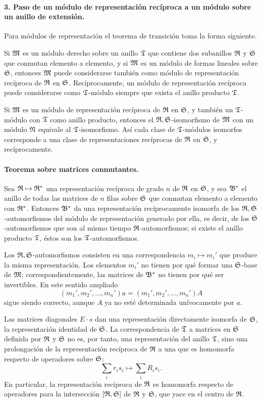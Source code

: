 \paragraph{3. Paso de un módulo de representación recíproca a un módulo sobre un anillo de extensión.}
Para módulos de representación el teorema de transición toma la forma siguiente.

Si \(\mathfrak M\) es un módulo derecho sobre un anillo \(\mathfrak T\) que contiene dos subanillos \(\mathfrak R\) y \(\mathfrak S\) que conmutan elemento a elemento, y si \(\mathfrak M\) es un módulo de formas lineales sobre \(\mathfrak S\), entonces \(\mathfrak M\) puede considerarse también como módulo de representación recíproca de \(\mathfrak R\) en \(\mathfrak S\). Recíprocamente, un módulo de representación recíproca puede considerarse como \(\mathfrak T\)-módulo siempre que exista el anillo producto \(\mathfrak T\).

Si \(\mathfrak M\) es un módulo de representación recíproca de \(\mathfrak R\) en \(\mathfrak S\), y también un \(\mathfrak T\)-módulo con \(\mathfrak T\) como anillo producto, entonces el \(\mathfrak R,\mathfrak S\)-isomorfismo de \(\mathfrak M\) con un módulo \(\mathfrak N\) equivale al \(\mathfrak T\)-isomorfismo. Así cada clase de \(\mathfrak T\)-módulos isomorfos corresponde a una clase de representaciones recíprocas de \(\mathfrak R\) en \(\mathfrak S\), y recíprocamente.

\paragraph{Teorema sobre matrices conmutantes.}
Sea \(\mathfrak R\mapsto\mathfrak R^*\) una representación recíproca de grado \(n\) de \(\mathfrak R\) en \(\mathfrak S\), y sea \(\mathfrak B^*\) el anillo de todas las matrices de \(n\) filas sobre \(\mathfrak S\) que conmutan elemento a elemento con \(\mathfrak R^*\). Entonces \(\mathfrak B^*\) da una representación recíprocamente isomorfa de los \(\mathfrak R,\mathfrak S\)-automorfismos del módulo de representación generado por ella, es decir, de los \(\mathfrak S\)-automorfismos que son al mismo tiempo \(\mathfrak R\)-automorfismos; si existe el anillo producto \(\mathfrak T\), éstos son los \(\mathfrak T\)-automorfismos.

Los \(\mathfrak R,\mathfrak S\)-automorfismos consisten en una correspondencia \(m_i\mapsto m_i'\) que produce la misma representación. Los elementos \(m_i'\) no tienen por qué formar una \(\mathfrak S\)-base de \(\mathfrak M\); correspondientemente, las matrices de \(\mathfrak B^*\) no tienen por qué ser invertibles. En este sentido ampliado
\[
        (m_1',m_2',\ldots,m_n')a=(m_1',m_2',\ldots,m_n')A
\]
sigue siendo correcto, aunque \(A\) ya no esté determinada unívocamente por \(a\).

Las matrices diagonales \(E\cdot s\) dan una representación directamente isomorfa de \(\mathfrak S\), la representación identidad de \(\mathfrak S\). La correspondencia de \(\mathfrak T\) a matrices en \(\mathfrak S\) definida por \(\mathfrak R\) y \(\mathfrak S\) no es, por tanto, una representación del anillo \(\mathfrak T\), sino una prolongación de la representación recíproca de \(\mathfrak R\) a una que es homomorfa respecto de operadores sobre \(\mathfrak S\):
\[
        \sum_i r_i s_i\longmapsto \sum_i R_i s_i.
\]
En particular, la representación recíproca de \(\mathfrak R\) es homomorfa respecto de operadores para la intersección \([\mathfrak R,\mathfrak S]\) de \(\mathfrak R\) y \(\mathfrak S\), que yace en el centro de \(\mathfrak R\).

